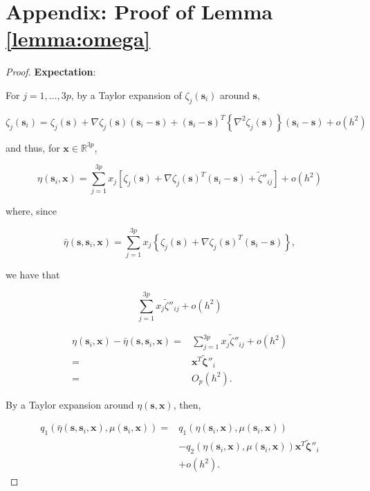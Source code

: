 \documentclass[authoryear,review, 12pt]{elsarticle}
\begin{document}
\section*{Appendix: Proof of Lemma \ref{lemma:omega}}
\begin{proof}
\textbf{Expectation}:

For $j=1,\dots,3p$, by a Taylor expansion of $\zeta_{j}\left(\bm{s}_{i}\right)$
around $\bm{s}$,

\[
\zeta_{j}\left(\bm{s}_{i}\right)=\zeta_{j}\left(\bm{s}\right)+\nabla\zeta_{j}\left(\bm{s}\right)\left(\bm{s}_{i}-\bm{s}\right)+\left(\bm{s}_{i}-\bm{s}\right)^{T}\left\{ \nabla^{2}\zeta_{j}\left(\bm{s}\right)\right\} \left(\bm{s}_{i}-\bm{s}\right)+o\left(h^{2}\right)
\]


and thus, for $\bm{x}\in\mathbb{R}^{3p}$, 

\[
\eta\left(\bm{s}_{i},\bm{x}\right)=\sum_{j=1}^{3p}x_{j}\left[\zeta_{j}\left(\bm{s}\right)+\nabla\zeta_{j}\left(\bm{s}\right)^{T}\left(\bm{s}_{i}-\bm{s}\right)+\tilde{\zeta}''_{ij}\right]+o\left(h^{2}\right)
\]


where, since 

\[
\bar{\eta}\left(\bm{s},\bm{s}_{i},\bm{x}\right)=\sum_{j=1}^{3p}x_{j}\left\{ \zeta_{j}\left(\bm{s}\right)+\nabla\zeta_{j}\left(\bm{s}\right)^{T}\left(\bm{s}_{i}-\bm{s}\right)\right\} ,
\]


we have that 

\[
\sum_{j=1}^{3p}x_{j}\tilde{\zeta}''_{ij}+o\left(h^{2}\right)
\]


\begin{align*}
\eta\left(\bm{s}_{i},\bm{x}\right)-\bar{\eta}\left(\bm{s},\bm{s}_{i},\bm{x}\right)= & \sum_{j=1}^{3p}x_{j}\tilde{\zeta}''_{ij}+o\left(h^{2}\right)\\
= & \bm{x}^{T}\tilde{\bm{\zeta}}''_{i}\\
= & O_{p}\left(h^{2}\right).
\end{align*}


By a Taylor expansion around $\eta\left(\bm{s},\bm{x}\right)$, then, 

\begin{align*}
q_{1}\left(\bar{\eta}\left(\bm{s},\bm{s}_{i},\bm{x}\right),\mu\left(\bm{s}_{i},\bm{x}\right)\right)= & q_{1}\left(\eta\left(\bm{s}_{i},\bm{x}\right),\mu\left(\bm{s}_{i},\bm{x}\right)\right)\\
 & -q_{2}\left(\eta\left(\bm{s}_{i},\bm{x}\right),\mu\left(\bm{s}_{i},\bm{x}\right)\right)\bm{x}^{T}\tilde{\bm{\zeta}}''_{i}\\
 & +o\left(h^{2}\right).
\end{align*}



\end{proof}
\end{document}
